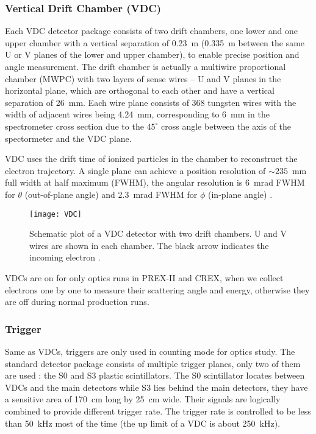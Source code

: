 \subsubsection{Vertical Drift Chamber (VDC)}
Each VDC detector package consists of two drift chambers, one lower and one upper
chamber with a vertical separation of 0.23~m (0.335~m between the same
U or V planes of the lower and upper chamber), to enable precise position and angle measurement. 
The drift chamber is actually a multiwire proportional chamber (MWPC) with two 
layers of sense wires -- U and V planes in the horizontal plane, which are 
orthogonal to each other and have a vertical separation of 26~mm. 
Each wire plane consists of 368 tungsten wires with the width of adjacent wires 
being 4.24~mm, corresponding to 6~mm in the spectrometer cross section due to the $45^\circ$
cross angle between the axis of the spectormeter and the VDC plane. 

VDC uses the drift time of ionized particles in the chamber to reconstruct 
the electron trajectory. A single plane can achieve a position resolution 
of $\sim 235$~mm full width at half maximum (FWHM), 
the angular resolution is 6~mrad FWHM for $\theta$ (out-of-plane angle) 
and 2.3~mrad FWHM for $\phi$ (in-plane angle) \cite{FISSUM2001108}.
\begin{figure}[!h]
    \centering
    \texttt{[image: VDC]}
    \caption[VDC]{Schematic plot of a VDC detector with two drift chambers.
    U and V wires are shown in each chamber. The black arrow indicates the 
    incoming electron \cite{FISSUM2001108}.
    }
\end{figure}

VDCs are on for only optics runs in PREX-II and CREX, when we collect electrons
one by one to measure their scattering angle and energy, otherwise they are
off during normal production runs.


\subsubsection{Trigger}
Same as VDCs, triggers are only used in counting mode for optics study. The standard
detector package consists of multiple trigger planes, only two of them are used :
the S0 and S3 plastic scintillators. The S0 scintillator locates between VDCs and the main
detectors while S3 lies behind the main detectors, they have a sensitive area
of 170~cm long by 25~cm wide. Their signals are logically combined to 
provide different trigger rate. The trigger rate is controlled to be less
than 50~kHz most of the time (the up limit of a VDC is about 250~kHz).

